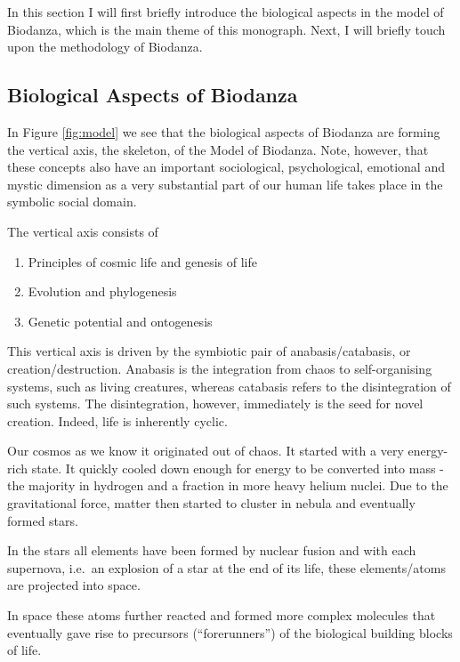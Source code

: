 \documentclass[
  11pt,
]{book}
\providecommand{\tightlist}{%
  \setlength{\itemsep}{0pt}\setlength{\parskip}{0pt}}
\begin{document}
In this section I will first briefly introduce the biological aspects in the model of Biodanza, which is the main theme of this monograph. Next, I will briefly touch upon the methodology of Biodanza.

\hypertarget{biological-aspects-of-biodanza}{%
\subsection{Biological Aspects of Biodanza}\label{biological-aspects-of-biodanza}}

In Figure \ref{fig:model} we see that the biological aspects of Biodanza are forming the vertical axis, the skeleton, of the Model of Biodanza. Note, however, that these concepts also have an important sociological, psychological, emotional and mystic dimension as a very substantial part of our human life takes place in the symbolic social domain.

The vertical axis consists of

\begin{enumerate}
\def\labelenumi{\arabic{enumi}.}
\tightlist
\item
  Principles of cosmic life and genesis of life
\item
  Evolution and phylogenesis
\item
  Genetic potential and ontogenesis
\end{enumerate}

This vertical axis is driven by the symbiotic pair of anabasis/catabasis, or creation/destruction. Anabasis is the integration from chaos to self-organising systems, such as living creatures, whereas catabasis refers to the disintegration of such systems. The disintegration, however, immediately is the seed for novel creation. Indeed, life is inherently cyclic.

Our cosmos as we know it originated out of chaos. It started with a very energy-rich state. It quickly cooled down enough for energy to be converted into mass - the majority in hydrogen and a fraction in more heavy helium nuclei. Due to the gravitational force, matter then started to cluster in nebula and eventually formed stars.

In the stars all elements have been formed by nuclear fusion and with each supernova, i.e.~an explosion of a star at the end of its life, these elements/atoms are projected into space.

In space these atoms further reacted and formed more complex molecules that eventually gave rise to precursors (``forerunners'') of the biological building blocks of life.
\end{document}
